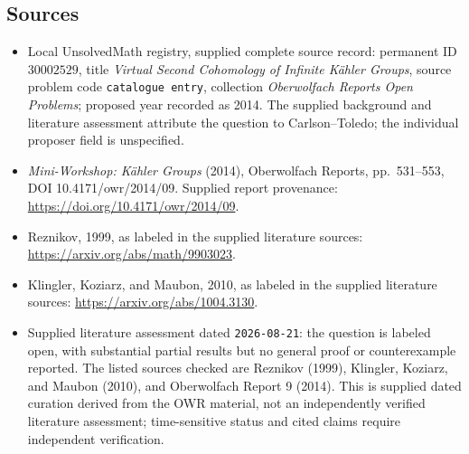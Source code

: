 \documentclass[11pt]{article}
\begin{document}
\subsection{Sources}
\begin{itemize}
\item Local UnsolvedMath registry, supplied complete source record: permanent ID \(30002529\), title \emph{Virtual Second Cohomology of Infinite K\"ahler Groups}, source problem code \texttt{catalogue entry}, collection \emph{Oberwolfach Reports Open Problems}; proposed year recorded as 2014. The supplied background and literature assessment attribute the question to Carlson--Toledo; the individual proposer field is unspecified.
\item \emph{Mini-Workshop: K\"ahler Groups} (2014), Oberwolfach Reports, pp.\ 531--553, DOI 10.4171/owr/2014/09. Supplied report provenance: \url{https://doi.org/10.4171/owr/2014/09}.
\item Reznikov, 1999, as labeled in the supplied literature sources: \url{https://arxiv.org/abs/math/9903023}.
\item Klingler, Koziarz, and Maubon, 2010, as labeled in the supplied literature sources: \url{https://arxiv.org/abs/1004.3130}.
\item Supplied literature assessment dated \texttt{2026-08-21}: the question is labeled open, with substantial partial results but no general proof or counterexample reported. The listed sources checked are Reznikov (1999), Klingler, Koziarz, and Maubon (2010), and Oberwolfach Report 9 (2014). This is supplied dated curation derived from the OWR material, not an independently verified literature assessment; time-sensitive status and cited claims require independent verification.
\end{itemize}
\end{document}

